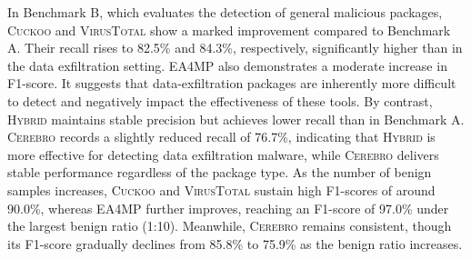 In Benchmark B, which evaluates the detection of general malicious packages, \textsc{Cuckoo} and \textsc{VirusTotal} show a marked improvement compared to Benchmark A. Their recall rises to 82.5\% and 84.3\%, respectively, significantly higher than in the data exfiltration setting. \textsc{EA4MP} also demonstrates a moderate increase in F1-score. It suggests that data-exfiltration packages are inherently more difficult to detect and negatively impact the effectiveness of these tools. By contrast, \textsc{Hybrid} maintains stable precision but achieves lower recall than in Benchmark A. \textsc{Cerebro} records a slightly reduced recall of 76.7\%, indicating that \textsc{Hybrid} is more effective for detecting data exfiltration malware, while \textsc{Cerebro} delivers stable performance regardless of the package type. As the number of benign samples increases, \textsc{Cuckoo} and \textsc{VirusTotal} sustain high F1-scores of around 90.0\%, whereas \textsc{EA4MP} further improves, reaching an F1-score of 97.0\% under the largest benign ratio (1:10). Meanwhile, \textsc{Cerebro} remains consistent, though its F1-score gradually declines from 85.8\% to 75.9\% as the benign ratio increases. 
    
